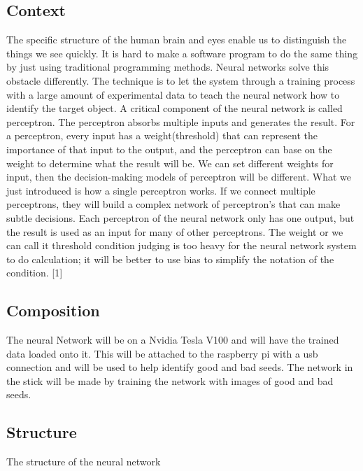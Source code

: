 \subsection{Context}
The specific structure of the human brain and eyes enable us to distinguish the things we see quickly. It is hard to make a software program to do the same thing by just using traditional programming methods. Neural networks solve this obstacle differently. The technique is to let the system through a training process with a large amount of experimental data to teach the neural network how to identify the target object. A critical component of the neural network is called perceptron. The perceptron absorbs multiple inputs and generates the result. For a perceptron, every input has a weight(threshold) that can represent the importance of that input to the output, and the perceptron can base on the weight to determine what the result will be. We can set different weights for input, then the decision-making models of perceptron will be different. What we just introduced is how a single perceptron works. If we connect multiple perceptrons, they will build a complex network of perceptron's that can make subtle decisions.  Each perceptron of the neural network only has one output, but the result is used as an input for many of other perceptrons. The weight or we can call it threshold condition judging is too heavy for the neural network system to do calculation; it will be better to use bias to simplify the notation of the condition. [1]

\subsection{Composition}
The neural Network will be on a Nvidia Tesla V100 and will have the trained data loaded onto it. This will be attached to the raspberry pi with a usb connection and will be used to help identify good and bad seeds. The network in the stick will be made by training the network with images of good and bad seeds. 

\subsection{Structure}
The structure of the neural network 

